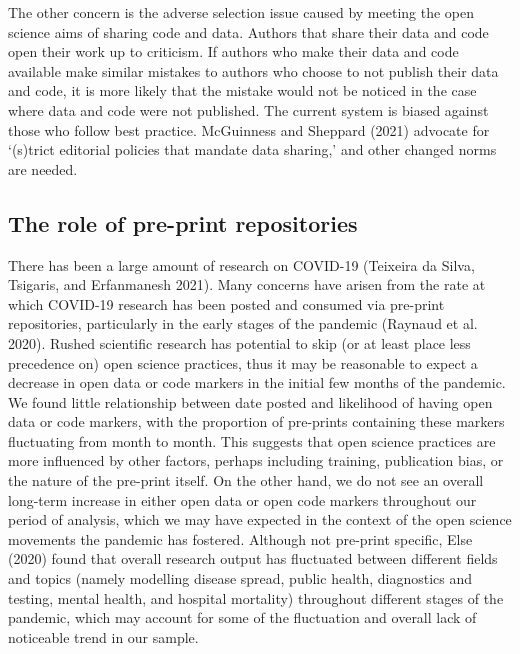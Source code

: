 \documentclass[
]{article}
\begin{document}
The other concern is the adverse selection issue caused by meeting the open science aims of sharing code and data. Authors that share their data and code open their work up to criticism. If authors who make their data and code available make similar mistakes to authors who choose to not publish their data and code, it is more likely that the mistake would not be noticed in the case where data and code were not published. The current system is biased against those who follow best practice. McGuinness and Sheppard (2021) advocate for `(s)trict editorial policies that mandate data sharing,' and other changed norms are needed.

\hypertarget{the-role-of-pre-print-repositories}{%
\subsection{The role of pre-print repositories}\label{the-role-of-pre-print-repositories}}

There has been a large amount of research on COVID-19 (Teixeira da Silva, Tsigaris, and Erfanmanesh 2021). Many concerns have arisen from the rate at which COVID-19 research has been posted and consumed via pre-print repositories, particularly in the early stages of the pandemic (Raynaud et al. 2020). Rushed scientific research has potential to skip (or at least place less precedence on) open science practices, thus it may be reasonable to expect a decrease in open data or code markers in the initial few months of the pandemic. We found little relationship between date posted and likelihood of having open data or code markers, with the proportion of pre-prints containing these markers fluctuating from month to month. This suggests that open science practices are more influenced by other factors, perhaps including training, publication bias, or the nature of the pre-print itself. On the other hand, we do not see an overall long-term increase in either open data or open code markers throughout our period of analysis, which we may have expected in the context of the open science movements the pandemic has fostered. Although not pre-print specific, Else (2020) found that overall research output has fluctuated between different fields and topics (namely modelling disease spread, public health, diagnostics and testing, mental health, and hospital mortality) throughout different stages of the pandemic, which may account for some of the fluctuation and overall lack of noticeable trend in our sample.
\end{document}
